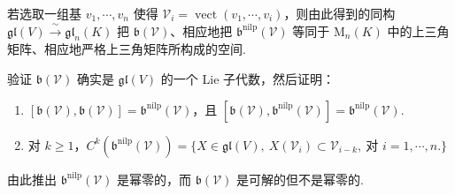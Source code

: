 \begin{remark*}
若选取一组基 $v_{1},\cdots,v_{n}$ 使得 $\mathcal V_{i}=\operatorname{vect}(v_{1},\cdots,v_{i})$，则由此得到的同构 $\mathfrak{gl}(V)\xrightarrow{\ \sim\ }\mathfrak{gl}_{n}(K)$ 把 $\mathfrak b(\mathcal V)$、相应地把 $\mathfrak b^{\mathrm{nilp}}(\mathcal V)$ 等同于 $\mathrm M_{n}(K)$ 中的上三角矩阵、相应地严格上三角矩阵所构成的空间.
\end{remark*}
\begin{exercise*}
验证 $\mathfrak b(\mathcal V)$ 确实是 $\mathfrak{gl}(V)$ 的一个 Lie 子代数，然后证明：
\begin{enumerate}[label=\roman*)]
\item $[\mathfrak b(\mathcal V),\mathfrak b(\mathcal V)]=\mathfrak b^{\mathrm{nilp}}(\mathcal V)$，且 $[\mathfrak b(\mathcal V),\mathfrak b^{\mathrm{nilp}}(\mathcal V)]=\mathfrak b^{\mathrm{nilp}}(\mathcal V)$.
\item 对 $k\geqslant 1$，$C^{k}(\mathfrak b^{\mathrm{nilp}}(\mathcal V))=\{X\in\mathfrak{gl}(V),\ X(\mathcal V_{i})\subset\mathcal V_{i-k},\ \text{对 }i=1,\cdots,n.\}$
\end{enumerate}
由此推出 $\mathfrak b^{\mathrm{nilp}}(\mathcal V)$ 是幂零的，而 $\mathfrak b(\mathcal V)$ 是可解的但不是幂零的.
\end{exercise*}
